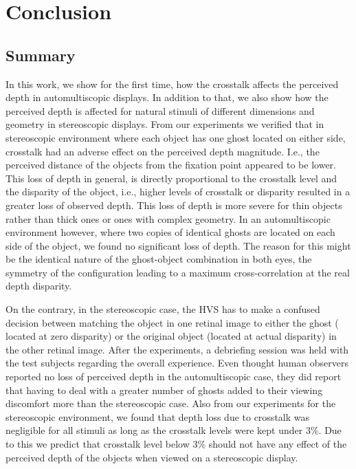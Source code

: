 \chapter{Conclusion}
\label{chap:Conclusion}

\section{Summary}
In this work, we show for the first time, how the crosstalk affects the perceived depth in automultiscopic displays. In addition to that, we also show how the perceived depth is affected for natural stimuli of different dimensions and geometry in stereoscopic displays. From our experiments we verified that in stereoscopic environment where each object has one ghost located on either side, crosstalk had an adverse effect on the perceived depth magnitude. I.e., the perceived distance of the objects from the fixation point appeared to be lower. This loss of depth in general, is directly proportional to the crosstalk level and the disparity of the object, i.e., higher levels of crosstalk or disparity resulted in a greater loss of observed depth. This loss of depth is more severe for thin objects rather than thick ones or ones with complex geometry. In an automultiscopic environment however, where two copies of identical ghosts are located on each side of the object, we found no significant loss of depth. The reason for this might be the identical nature of the ghost-object combination in both eyes, the symmetry of the configuration leading to a maximum cross-correlation at the real depth disparity. 

On the contrary, in the stereoscopic case, the HVS has to make a confused decision between matching the object in one retinal image to either the ghost ( located at zero disparity) or the original object (located at actual disparity) in the other retinal image. After the experiments, a debriefing session was held with the test subjects regarding the overall experience. Even thought human observers reported no loss of perceived depth in the automultiscopic case, they did report that having to deal with a greater number of ghosts added to their viewing discomfort more than the stereoscopic case. Also from our experiments for the stereoscopic environment, we found that depth loss due to crosstalk was negligible for all stimuli as long as the crosstalk levels were kept under 3\%. Due to this we predict that crosstalk level below 3\% should not have any effect of the perceived depth of the objects when viewed on a stereoscopic display.

